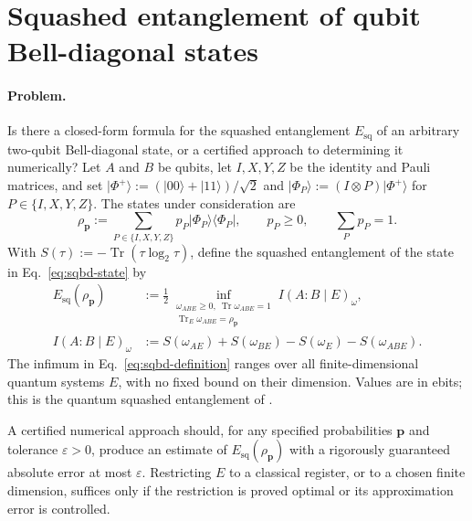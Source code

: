 \section{Squashed entanglement of qubit Bell-diagonal states}
\label{sec:op_64e58085fa92c1a8}

\paragraph{Problem.}
Is there a closed-form formula for the squashed entanglement
$E_{\mathrm{sq}}$ of an arbitrary two-qubit Bell-diagonal state, or a
certified approach to determining it numerically?  Let $A$ and $B$ be qubits, let $I,X,Y,Z$ be the identity and Pauli
matrices, and set $\lvert\Phi^+\rangle:=(\lvert00\rangle+\lvert11\rangle)/\sqrt2$
and $\lvert\Phi_P\rangle:=(I\otimes P)\lvert\Phi^+\rangle$ for
$P\in\{I,X,Y,Z\}$.  The states under consideration are
\begin{equation}
  \rho_{\mathbf p}:=\sum_{P\in\{I,X,Y,Z\}}p_P
  \lvert\Phi_P\rangle\!\langle\Phi_P\rvert,
  \qquad p_P\geq0,\qquad \sum_Pp_P=1.
  \label{eq:sqbd-state}
\end{equation}
With $S(\tau):=-\operatorname{Tr}(\tau\log_2\tau)$, define the squashed
entanglement of the state in Eq.~\eqref{eq:sqbd-state} by
\begin{equation}
  \begin{aligned}
    E_{\mathrm{sq}}(\rho_{\mathbf p})
      &:=\frac12\inf_{\substack{\omega_{ABE}\geq0,\ \operatorname{Tr}\omega_{ABE}=1\\
                    \operatorname{Tr}_E\omega_{ABE}=\rho_{\mathbf p}}}
                    I(A:B\mid E)_\omega,\\
    I(A:B\mid E)_\omega
      &:=S(\omega_{AE})+S(\omega_{BE})-S(\omega_E)-S(\omega_{ABE}).
  \end{aligned}
  \label{eq:sqbd-definition}
\end{equation}
The infimum in Eq.~\eqref{eq:sqbd-definition} ranges over all finite-dimensional
quantum systems $E$, with no fixed bound on their dimension.  Values are in
ebits; this is the quantum squashed entanglement of
.

A certified numerical approach should, for any specified probabilities
$\mathbf p$ and tolerance $\varepsilon>0$, produce an estimate of
$E_{\mathrm{sq}}(\rho_{\mathbf p})$ with a rigorously guaranteed absolute
error at most $\varepsilon$.  Restricting $E$ to a classical register, or
to a chosen finite dimension, suffices only if the restriction is proved
optimal or its approximation error is controlled.


